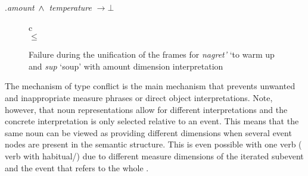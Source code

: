 \ex.\label{const:temp:amount}\textit{amount} $\,\wedge\,$ \textit{temperature} $\rightarrow \bot$

\begin{figure}
\begin{tabular}{c}
\\
 $\leq$ 
\end{tabular}
\caption{Failure during the unification of the frames for \textit{nagret'} `to warm up and  \textit{sup} `soup' with amount dimension interpretation \label{frame:nagret:soup:amount}}
\end{figure}

The mechanism of type conflict is the main mechanism that prevents un\-want\-ed  and inappropriate measure phrases or direct object interpretations. Note, however, that noun representations allow for different interpretations and the concrete interpretation is only selected relative to an event. This means that the same noun can be viewed as providing different dimensions when several event nodes are present in the semantic structure. This is even possible with one verb ( verb with habitual/) due to different measure dimensions of the iterated subevent and the event that refers to the whole  .

